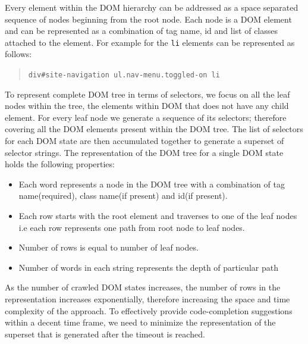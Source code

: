 		Every element within the DOM hierarchy can be addressed as a space separated sequence of nodes beginning from the root node. Each node is a DOM element and can be represented as a combination of tag name, id and list of classes attached to the element. For example for  the \texttt{li} elements can be represented as follows:
			
		\begin{quote}
			\texttt{div\#site-navigation ul.nav-menu.toggled-on li}
		\end{quote}
			
		To represent complete DOM tree in terms of \css selectors, we focus on all the leaf nodes within the tree, \ie the elements within DOM that does not have any child element. For every leaf node we generate a sequence of its \css selectors; therefore covering all the DOM elements present within the DOM tree. The list of \css selectors for each DOM state are then accumulated together to generate a superset of \css selector strings. The \css representation of the DOM tree for a single DOM state holds the following properties:
		\begin{itemize}
			 \item Each word represents a node in the DOM tree with a combination of tag name(required), class name(if present) and id(if present).
			 \item Each row starts with the root element and traverses to one of the leaf nodes i.e each row represents one path from root node to leaf nodes.
			\item Number of rows is equal to number of leaf nodes.
			 \item Number of words in each string represents the depth of particular path
		\end{itemize}
		
		As the number of crawled DOM states increases, the number of rows in the \css representation increases exponentially, therefore increasing the space and time complexity of the approach. To effectively provide code-completion suggestions within a decent time frame, we need to minimize the \css representation of the superset that is generated after the timeout is reached.
		
